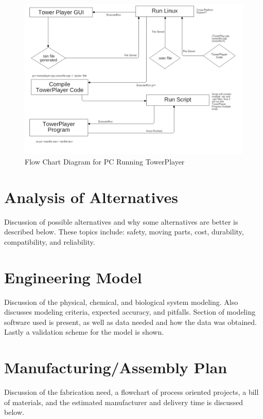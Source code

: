 \documentclass[12pt]{article}
\begin{document}
{		\begin{figure}[ht!]
			\centering
			\includegraphics[width=170mm]{assets/PCRunningTowerPlayerFlowChartDiagram.png}
			\caption{Flow Chart Diagram for PC Running TowerPlayer \label{overflow}}
		\end{figure}

	\clearpage

\section{Analysis of Alternatives}
	Discussion of possible alternatives and why some alternatives are better is described below. These topics include: safety, moving parts, cost, durability, compatibility, and reliability.

	\newpage

\section{Engineering Model}
	Discussion of the physical, chemical, and biological system modeling. Also discusses modeling criteria, expected accuracy, and pitfalls. Section of modeling software used is present, as well as data needed and how the data was obtained. Lastly a validation scheme for the model is shown.

	\newpage

\section{Manufacturing/Assembly Plan}
	Discussion of the fabrication need, a flowchart of process oriented projects, a bill of materials, and the estimated manufacturer and delivery time is discussed below.

}
\end{document}
